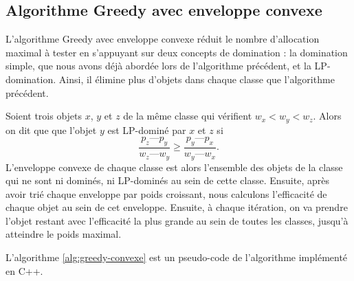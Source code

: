 \documentclass{article}
\begin{document}
\subsection{Algorithme Greedy avec enveloppe convexe}
L'algorithme Greedy avec enveloppe convexe réduit le nombre d'allocation maximal à tester en s'appuyant sur deux concepts de domination : la domination simple, que nous avons déjà abordée lors de l'algorithme précédent, et la LP-domination. Ainsi, il élimine plus d'objets dans chaque classe que l'algorithme précédent. 

Soient trois objets $x$, $y$ et $z$ de la même classe qui vérifient $w_{x} < w_{y} < w_{z}$. Alors on dit que que l'objet $y$ est LP-dominé par $x$ et $z$ si 
\[ \frac{p_z—p_y}{w_z—w_y} \geq \frac{p_y—p_x}{w_y—w_x}. \]
L'enveloppe convexe de chaque classe est alors l'ensemble des objets de la classe qui ne sont ni dominés, ni LP-dominés au sein de cette classe. Ensuite, après avoir trié chaque enveloppe par poids croissant, nous calculons l'efficacité de chaque objet au sein de cet enveloppe. Ensuite, à chaque itération, on va prendre l'objet restant avec l'efficacité la plus grande au sein de toutes les classes, jusqu'à atteindre le poids maximal.

L'algorithme \ref{alg:greedy-convexe} est un pseudo-code de l'algorithme implémenté en C++.
\end{document}
